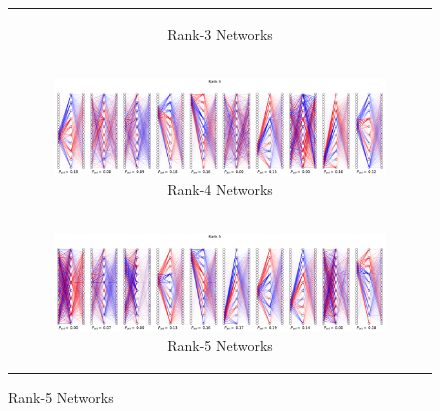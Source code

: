 \documentclass{article}
\theoremstyle{plain}
\theoremstyle{definition}
\theoremstyle{remark}
\begin{document}
\begin{figure}[ht]
\begin{minipage}{\textwidth}
\begin{tabular}{c}
\begin{subfigure}{0.3\textwidth}
                \caption{Rank-3 Networks}
            \end{subfigure} \\
            \begin{subfigure}{0.3\textwidth}
                \centering
                \includegraphics[width=\linewidth]{../figures/s6_high_rank_decompositions_rank4.pdf}
                \caption{Rank-4 Networks}
            \end{subfigure} \\
            \begin{subfigure}{0.3\textwidth}
                \centering
                \includegraphics[width=\linewidth]{../figures/s6_high_rank_decompositions_rank5.pdf}
                \caption{Rank-5 Networks}
            \end{subfigure}  
        \end{tabular}
    \end{minipage}

\end{figure}
\end{document}
